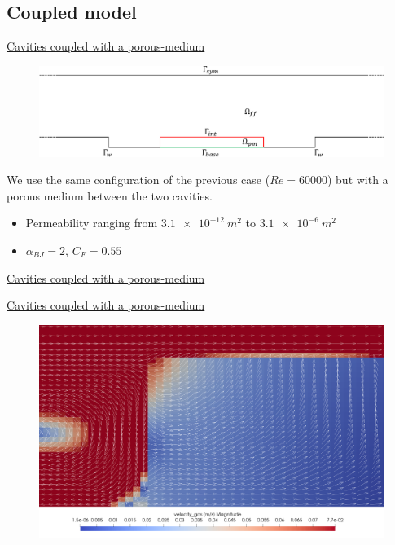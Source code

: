 \documentclass{beamer}
\begin{document}
\subsection*{Coupled model}
\begin{frame}[label=coupled]{\hyperlink{coupledSupp}{Cavities coupled with a 
porous-medium}}
\begin{figure}
	\centering
	\includegraphics[width=\textwidth]{cavities_multidomain.pdf}
\end{figure}
We use the same configuration of the previous case ($Re=60000$) but with a 
porous medium between the two cavities.
\begin{itemize}
	\item Permeability ranging from $\SI{3.1e-12}{m^2}$ to $\SI{3.1e-6}{m^2}$
	\item $\alpha_{BJ} = 2$, $C_F=0.55$
\end{itemize}
\end{frame}
\begin{frame}{\hyperlink{coupledSupp}{Cavities coupled with a porous-medium}}
\begin{figure}
	\centering
	\hspace{-0.5cm}
	
\end{figure}
\end{frame}
\begin{frame}{\hyperlink{coupledSupp}{Cavities coupled with a porous-medium}}
\begin{figure}
	\centering
	\includegraphics[height=0.82\textheight]{coupled_first_cavity.png}
\end{figure}
\end{frame}
\end{document}

